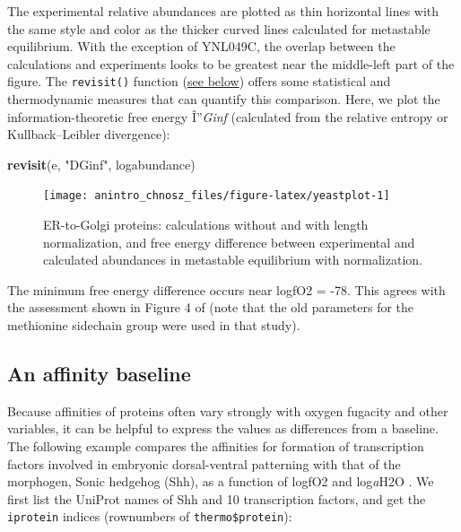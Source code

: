 \documentclass[]{tufte-handout}
\newenvironment{Shaded}{}{}
\newcommand{\KeywordTok}[1]{\textcolor[rgb]{0.00,0.44,0.13}{\textbf{#1}}}
\newcommand{\StringTok}[1]{\textcolor[rgb]{0.25,0.44,0.63}{#1}}
\newcommand{\NormalTok}[1]{#1}
\begin{document}
The experimental relative abundances are plotted as thin horizontal
lines with the same style and color as the thicker curved lines
calculated for metastable equilibrium. With the exception of YNL049C,
the overlap between the calculations and experiments looks to be
greatest near the middle-left part of the figure. The
{\texttt{revisit()}} function
(\protect\hyperlink{optimization-of-chemical-activities}{see below})
offers some statistical and thermodynamic measures that can quantify
this comparison. Here, we plot the information-theoretic free energy
Î''\emph{Ginf} (calculated from the relative entropy or
Kullback--Leibler divergence):

\begin{Shaded}
\begin{Highlighting}[]
\KeywordTok{revisit}\NormalTok{(e, }\StringTok{"DGinf"}\NormalTok{, logabundance)}
\end{Highlighting}
\end{Shaded}

\begin{figure}
\texttt{[image: anintro\_chnosz\_files/figure-latex/yeastplot-1]} \caption[ER-to-Golgi proteins]{ER-to-Golgi proteins: calculations without and with length normalization, and free energy difference between experimental and calculated abundances in metastable equilibrium with normalization.}\label{fig:yeastplot}
\end{figure}

The minimum free energy difference occurs near logfO2 = -78. This agrees
with the assessment shown in Figure 4 of \citet{Dic09} (note that the
old parameters for the methionine sidechain group were used in that
study).

\subsection{An affinity baseline}\label{an-affinity-baseline}

Because affinities of proteins often vary strongly with oxygen fugacity
and other variables, it can be helpful to express the values as
differences from a baseline. The following example compares the
affinities for formation of transcription factors involved in embryonic
dorsal-ventral patterning with that of the morphogen, Sonic hedgehog
(Shh), as a function of logfO2 and log\emph{a}H2O \citep{Dic15}. We
first list the UniProt names of Shh and 10 transcription factors, and
get the \texttt{iprotein} indices (rownumbers of
\texttt{thermo\$protein}):
\end{document}
